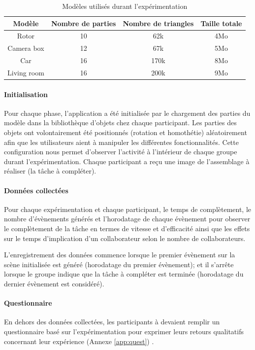 \begin{table}[ht]
	\centering
	\caption{Modèles utilisés durant l'expérimentation}
	\label{table:summary}
	\begin{tabular}{cccc}\hline
		\textbf{Modèle}  & \textbf{Nombre de parties} &  \textbf{Nombre de triangles} 
		& \textbf{Taille totale}  \\ \hline
		Rotor      &   10  &    62k & 4Mo        \\
		Camera box        &   12  &    67k & 5Mo        \\
		Car      &   16  &      170k & 8Mo \\       
		Living room      &   16  &      200k & 9Mo \\    \bottomrule
	\end{tabular}
\end{table}
\paragraph{Initialisation}

Pour chaque phase, l'application a été initialisée par le chargement des parties du 
modèle dans la bibliothèque d'objets chez chaque participant. Les parties des 
objets ont volontairement été positionnés (rotation et homothétie) aléatoirement 
afin que les utilisateurs aient à manipuler les différentes fonctionnalités. Cette 
configuration nous permet d'observer l'activité à l'intérieur de chaque groupe durant 
l'expérimentation. Chaque participant a reçu une image de l'assemblage à réaliser 
(la tâche à compléter). 

\paragraph{Données collectées}
Pour chaque expérimentation et chaque participant, le temps de complètement, le 
nombre d'évènements générés et l'horodatage de chaque évènement pour 
observer le complètement de la tâche en termes de vitesse et d'efficacité ainsi 
que les effets sur le temps d'implication d'un collaborateur selon le nombre de 
collaborateurs. 

L'enregistrement des données commence lorsque le premier évènement sur la 
scène initialisée est généré (horodatage du premier évènement); et il s'arrête 
lorsque le groupe indique que la tâche à compléter est terminée (horodatage du 
dernier évènement est considéré).


\paragraph{Questionnaire}
En dehors des données collectées, les participants à devaient remplir un 
questionnaire basé sur l'expérimentation pour exprimer leurs retours qualitatifs 
concernant leur expérience (Annexe \ref{app:quest}) . 

